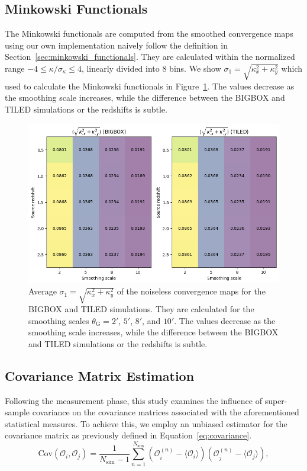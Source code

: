 \subsection{Minkowski Functionals}
The Minkowski functionals are computed from the smoothed convergence maps using our own implementation naively follow the definition in Section~\ref{sec:minkowski_functionals}. They are calculated within the normalized range $-4 \leq \kappa/\sigma_{\kappa} \leq 4$, linearly divided into 8 bins. We show $\sigma_1 = \sqrt{\kappa_{x}^2 + \kappa_{y}^2}$ which used to calculate the Minkowski functionals in Figure~\ref{fig:avg_sigma1}. The values decrease as the smoothing scale increases, while the difference between the BIGBOX and TILED simulations or the redshifts is subtle.

\begin{figure}[ht]
    \centering
    \includegraphics[width=\textwidth]{figures/avg_sigma1.png}
    \caption{Average $\sigma_1 = \sqrt{\kappa_{x}^2 + \kappa_{y}^2}$ of the noiseless convergence maps for the BIGBOX and TILED simulations. They are calculated for the smoothing scales $\theta_{\mathrm{G}} = 2'$, $5'$, $8'$, and $10'$. The values decrease as the smoothing scale increases, while the difference between the BIGBOX and TILED simulations or the redshifts is subtle.
    } \label{fig:avg_sigma1}
\end{figure}

\subsection{Covariance Matrix Estimation}
Following the measurement phase, this study examines the influence of super-sample covariance on the covariance matrices associated with the aforementioned statistical measures. To achieve this, we employ an unbiased estimator for the covariance matrix as previously defined in Equation~\ref{eq:covariance}. 
\begin{equation}
    \label{eq:covariance}
    \mathrm{Cov}(\mathcal{O}_i, \mathcal{O}_j) = \frac{1}{N_{\mathrm{sim}} - 1} \sum_{n=1}^{N_{\mathrm{sim}}} (\mathcal{O}_i^{(n)} - \langle \mathcal{O}_i \rangle) (\mathcal{O}_j^{(n)} - \langle \mathcal{O}_j \rangle),
\end{equation}

